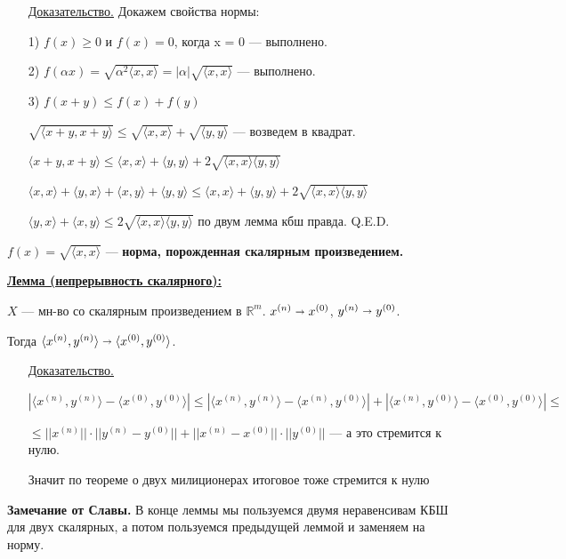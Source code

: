 \documentclass{article}
\newcommand{\thmm}[1]{\underline{\textbf{#1}}}
\begin{document}
    \begin{enumerate}
        \item[] \uline{Доказательство.} Докажем свойства нормы:
        \item[1)] $f(x) \geq 0$ и $f(x) = 0$, когда x = 0 --- выполнено.

        \item[2)] $f(\alpha x) = \sqrt{\alpha^2 \langle x,x\rangle} = |\alpha|\sqrt{\langle x,x\rangle}$ --- выполнено.

        \item[3)] $f(x+y) \leq f(x) + f(y)$
 
        $\sqrt{\langle x+y, x+y \rangle} \leq \sqrt{\langle x,x \rangle} + \sqrt{\langle y,y \rangle}$ --- возведем в квадрат.

        $\langle x+y, x+y \rangle \leq \langle x,x \rangle + \langle y,y \rangle + 2 \sqrt{\langle x,x \rangle \langle y,y \rangle }$
        
        $\langle x,x \rangle + \langle y,x \rangle + \langle x,y \rangle +\langle y,y \rangle \leq \langle x,x \rangle + \langle y,y \rangle + 2 \sqrt{\langle x,x \rangle \langle y,y \rangle } $

        $\langle y,x \rangle + \langle x,y \rangle \leq 2 \sqrt{\langle x,x \rangle \langle y,y \rangle } $  по двум лемма кбш правда. Q.E.D.
        
    \end{enumerate}
    $f(x) = \sqrt{\langle x,x \rangle}$  --- \textbf{норма, порожденная скалярным произведением.}

    \thmm{Лемма (непрерывность скалярного):}

    $X$ --- мн-во со скалярным произведением в $\mathbb{R}^m$. $x^{(n)} \shortrightarrow x^{(0)}$, $y^{(n)} \shortrightarrow y^{(0)}$.

    Тогда $\langle x^{(n)}, y^{(n)}\rangle \shortrightarrow \langle x^{(0)},y^{(0)}\rangle$.

     \begin{enumerate}
        \item[] \uline{Доказательство.}
        
        $|\langle x^{(n)}, y^{(n)}\rangle - \langle x^{(0)},y^{(0)}\rangle| \leq |\langle x^{(n)}, y^{(n)}\rangle - \langle x^{(n)},y^{(0)}\rangle| + |\langle x^{(n)}, y^{(0)}\rangle - \langle x^{(0)},y^{(0)}\rangle|\leq$

        $\leq ||x^{(n)}||\cdot ||y^{(n)}-y^{(0)}|| + ||x^{(n)}-x^{(0)}|| \cdot ||y^{(0)}||$ --- а это стремится к нулю.

        Значит по теореме о двух милиционерах итоговое тоже стремится к нулю
    \end{enumerate}
    \textbf{Замечание от Славы.} В конце леммы мы пользуемся двумя неравенсивам КБШ для двух скалярных, а потом пользуемся предыдущей леммой и заменяем на норму.
\end{document}
